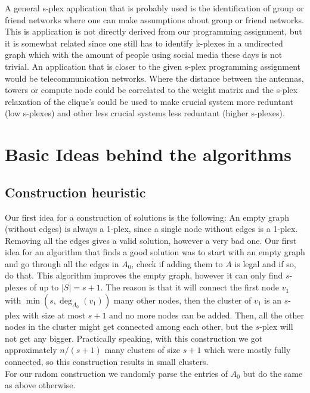 A general s-plex application that is probably used is the identification of group or friend networks
where one can make assumptions about group or friend networks. This is application is not directly
derived from our programming assignment, but it is somewhat related since one still has to identify k-plexes in a
undirected graph which with the amount of people using social media these days is not trivial.
An application that is closer to the given s-plex programming assignment would be telecommunication networks.
Where the distance between the antennas, towers or compute node could be correlated to the weight matrix and the s-plex
relaxation of the clique's could be used to make crucial system more reduntant (low s-plexes) and other less crucial systems
less reduntant (higher s-plexes).

\section{Basic Ideas behind the algorithms}
\label{sec:basic_ideas}

\subsection{Construction heuristic}
\label{const_idea}

Our first idea for a construction of solutions is the following: An empty graph (without edges) is always a 1-plex, since a single node without edges is a 1-plex. Removing all the edges gives a valid solution, however a very bad one. Our first idea for an algorithm that finds a good solution was to start with an empty graph and go through all the edges in $A_0$, check if adding them to $A$ is legal and if so, do that. This algorithm improves the empty graph, however it can only find $s$-plexes of up to $|S|=s+1$. The reason is that it will connect the first node $v_1$ with $\min(s,\deg_{A_0} (v_1))$ many other nodes, then the cluster of $v_1$ is an $s$-plex with size at most $s+1$ and no more nodes can be added. Then, all the other nodes in the cluster might get connected among each other, but the $s$-plex will not get any bigger. Practically speaking, with this construction we got approximately $n/(s+1)$ many clusters of size $s+1$ which were mostly fully connected, so this construction results in small clusters.\\
For our radom construction we randomly parse the entries of $A_0$ but do the same as above otherwise.\\

